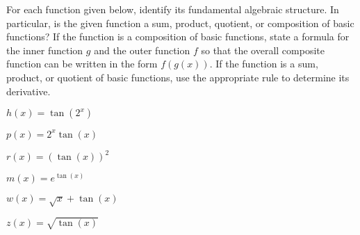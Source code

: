 \begin{pa} \label{PA:2.5}
For each function given below, identify its fundamental algebraic structure.  In particular, is the given function a sum, product, quotient, or composition of basic functions?  If the function is a composition of basic functions, state a formula for the inner function $g$ and the outer function $f$ so that the overall composite function can be written in the form $f(g(x))$.  If the function is a sum, product, or quotient of basic functions, use the appropriate rule to determine its derivative. 
\ba
	\item $h(x) = \tan(2^x)$
	\item $p(x) = 2^x \tan(x)$
	\item $r(x) = (\tan(x))^2$
	\item $m(x) = e^{\tan(x)}$
	\item $w(x) = \sqrt{x} + \tan(x)$
	\item $z(x) = \sqrt{\tan(x)}$
\ea
\end{pa} 
\afterpa